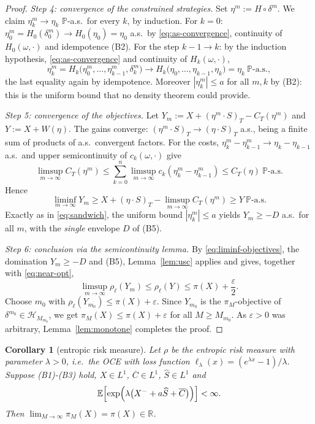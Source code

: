 \documentclass[11pt,a4paper]{report}
\numberwithin{equation}{chapter}
\theoremstyle{plain}
\newtheorem{corollary}[proposition]{Corollary}
\theoremstyle{definition}
\newcommand{\E}{\mathbb{E}}
\newcommand{\PP}{\mathbb{P}}
\newcommand{\R}{\mathbb{R}}
\newcommand{\HH}{\mathcal{H}}
\newcommand{\as}{\ \PP\text{-a.s.}}
\begin{document}
\begin{proof}
    \emph{Step 4: convergence of the constrained strategies.} Set $\eta^m:=H\circ\delta^m$. We claim $\eta^m_k\to\eta_k$ $\PP$-a.s.\ for every $k$, by induction. For $k=0$: $\eta^m_0=H_0(\delta^m_0)\to H_0(\eta_0)=\eta_0$ a.s.\ by \eqref{eq:as-convergence}, continuity of $H_0(\omega,\cdot)$ and idempotence (B2). For the step $k-1\to k$: by the induction hypothesis, \eqref{eq:as-convergence} and continuity of $H_k(\omega,\cdot)$,
    \[
        \eta^m_k=H_k\bigl(\eta^m_0,\dots,\eta^m_{k-1},\delta^m_k\bigr)
        \longrightarrow H_k\bigl(\eta_0,\dots,\eta_{k-1},\eta_k\bigr)=\eta_k\as,
    \]
    the last equality again by idempotence. Moreover $|\eta^m_k|\le a$ for all $m,k$ by (B2): this is the uniform bound that no density theorem could provide.

    \emph{Step 5: convergence of the objectives.} Let $Y_m:=X+(\eta^m\cdot S)_T-C_T(\eta^m)$ and $Y:=X+W(\eta)$. The gains converge: $(\eta^m\cdot S)_T\to(\eta\cdot S)_T$ a.s., being a finite sum of products of a.s.\ convergent factors. For the costs, $\eta^m_k-\eta^m_{k-1}\to\eta_k-\eta_{k-1}$ a.s.\ and upper semicontinuity of $c_k(\omega,\cdot)$ give
    \[
        \limsup_{m\to\infty}C_T(\eta^m)\le\sum_{k=0}^n\limsup_{m\to\infty}c_k(\eta^m_k-\eta^m_{k-1})\le C_T(\eta)\as
    \]
    Hence
    \begin{equation}\label{eq:liminf-objectives}
        \liminf_{m\to\infty}Y_m\ge X+(\eta\cdot S)_T-\limsup_{m\to\infty}C_T(\eta^m)\ge Y\as
    \end{equation}
    Exactly as in \eqref{eq:sandwich}, the uniform bound $|\eta^m_k|\le a$ yields $Y_m\ge-D$ a.s.\ for all $m$, with the \emph{single} envelope $D$ of (B5).

    \emph{Step 6: conclusion via the semicontinuity lemma.} By \eqref{eq:liminf-objectives}, the domination $Y_m\ge-D$ and (B5), Lemma~\ref{lem:usc} applies and gives, together with \eqref{eq:near-opt},
    \[
        \limsup_{m\to\infty}\rho_\ell(Y_m)\le\rho_\ell(Y)\le\pi(X)+\frac{\varepsilon}{2}.
    \]
    Choose $m_0$ with $\rho_\ell(Y_{m_0})\le\pi(X)+\varepsilon$. Since $Y_{m_0}$ is the $\pi_M$-objective of $\delta^{m_0}\in\HH_{M_{m_0}}$, we get $\pi_M(X)\le\pi(X)+\varepsilon$ for all $M\ge M_{m_0}$. As $\varepsilon>0$ was arbitrary, Lemma~\ref{lem:monotone} completes the proof.
\end{proof}

\begin{corollary}[entropic risk measure]\label{cor:entropic}
    Let $\rho$ be the entropic risk measure with parameter $\lambda>0$, i.e.\ the OCE with loss function $\ell_\lambda(x)=(e^{\lambda x}-1)/\lambda$. Suppose \textup{(B1)-(B3)} hold, $X\in L^1$, $\overline C\in L^1$, $\widehat S\in L^1$ and
    \[
        \E\Bigl[\exp\Bigl(\lambda\bigl(X^-+a\widehat S+\overline C\bigr)\Bigr)\Bigr]<\infty.
    \]
    Then $\lim_{M\to\infty}\pi_M(X)=\pi(X)\in\R$.
\end{corollary}
\end{document}
